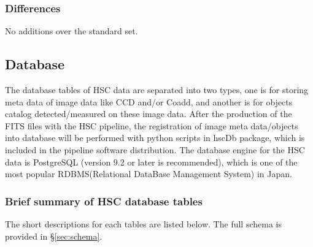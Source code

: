 \documentclass[12pt]{article}
\begin{document}
\subsubsection{Differences}

No additions over the standard set.

\subsection{Database}
\label{sec:database}

The database tables of HSC data are separated into two types, one is for storing meta data 
of image data like CCD and/or Coadd, and another is for objects catalog detected/measured 
on these image data. After the production of the FITS files with the HSC pipeline, the 
registration of image meta data/objects into database will be performed with python scripts 
in hscDb package, which is included in the pipeline software distribution. The database engine 
for the HSC data is PostgreSQL (version 9.2 or later is recommended), which is one of the most 
popular RDBMS(Relational DataBase Management System) in Japan.  

\subsubsection{Brief summary of HSC database tables}
The short descriptions for each tables are listed below.  The full schema is provided in \S\ref{sec:schema}.
\end{document}

